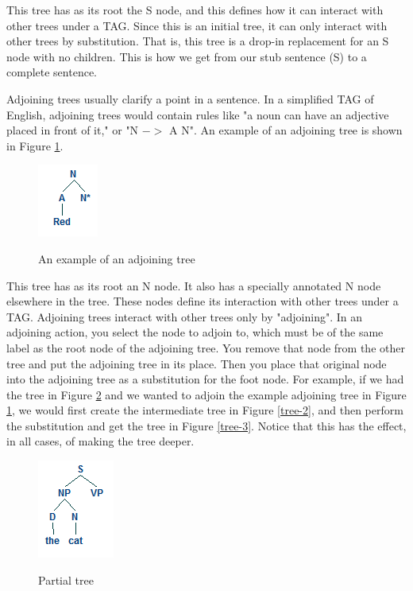This tree has as its root the S node, and this defines how it can interact with other
trees under a TAG.  Since this is an initial tree, it can only interact with other trees by
substitution.  That is, this tree is a drop-in replacement for an S node with no children.
This is how we get from our stub sentence (S) to a complete sentence.

Adjoining trees usually clarify a point in a sentence.  In a simplified TAG of English, adjoining
trees would contain rules like "a noun can have an adjective placed in front of it," or "N $->$ A N".
An example of an adjoining tree is shown in Figure \ref{adjoining-tree-example}.

\begin{figure}
\centering
\caption{An example of an adjoining tree}
\includegraphics{adjoining-tree-example.png}
\label{adjoining-tree-example}
\end{figure}

This tree has as its root an N node.  It also has a specially annotated N node elsewhere in the
tree.  These nodes define its interaction with other trees under a TAG.  Adjoining trees interact
with other trees only by "adjoining".  In an adjoining action, you select the node
to adjoin to, which must be of the same label as the root node of the adjoining tree.  You remove
that node from the other tree and put the adjoining tree in its place.  Then
you place that original node into the adjoining tree as a substitution for the foot node.
For example, if we had the tree in Figure \ref{tree-1} and we wanted to adjoin the example adjoining tree
in Figure \ref{adjoining-tree-example}, we would first create the intermediate tree in Figure \ref{tree-2},
and then perform the substitution and get the tree in Figure \ref{tree-3}.  Notice that this has the effect,
in all cases, of making the tree deeper.

\begin{figure}
\centering
\caption{Partial tree}
\includegraphics{tree-1.png}
\label{tree-1}
\end{figure}

